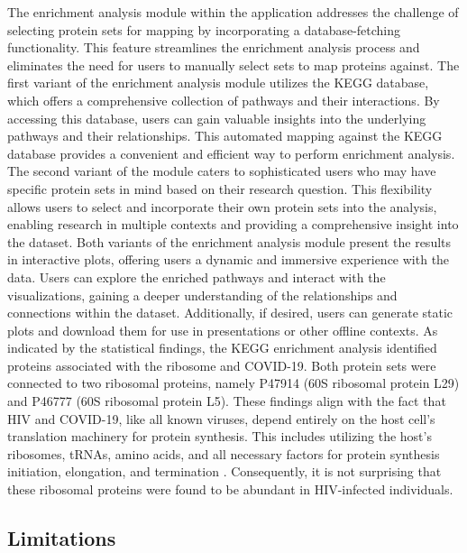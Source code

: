 \documentclass[
  11pt,
]{article}
\let\origfigure\figure
\begin{document}
The enrichment analysis module within the application addresses the
challenge of selecting protein sets for mapping by incorporating a
database-fetching functionality. This feature streamlines the enrichment
analysis process and eliminates the need for users to manually select
sets to map proteins against. The first variant of the enrichment
analysis module utilizes the KEGG database, which offers a comprehensive
collection of pathways and their interactions. By accessing this
database, users can gain valuable insights into the underlying pathways
and their relationships. This automated mapping against the KEGG
database provides a convenient and efficient way to perform enrichment
analysis. The second variant of the module caters to sophisticated users
who may have specific protein sets in mind based on their research
question. This flexibility allows users to select and incorporate their
own protein sets into the analysis, enabling research in multiple
contexts and providing a comprehensive insight into the dataset. Both
variants of the enrichment analysis module present the results in
interactive plots, offering users a dynamic and immersive experience
with the data. Users can explore the enriched pathways and interact with
the visualizations, gaining a deeper understanding of the relationships
and connections within the dataset. Additionally, if desired, users can
generate static plots and download them for use in presentations or
other offline contexts. As indicated by the statistical findings, the
KEGG enrichment analysis identified proteins associated with the
ribosome and COVID-19. Both protein sets were connected to two ribosomal
proteins, namely P47914 (60S ribosomal protein L29) and P46777 (60S
ribosomal protein L5). These findings align with the fact that HIV and
COVID-19, like all known viruses, depend entirely on the host cell's
translation machinery for protein synthesis. This includes utilizing the
host's ribosomes, tRNAs, amino acids, and all necessary factors for
protein synthesis initiation, elongation, and termination
\citep{Ohlmann2014}. Consequently, it is not surprising that these
ribosomal proteins were found to be abundant in HIV-infected
individuals.

\hypertarget{limitations}{%
\subsection{Limitations}\label{limitations}}

\bgroup  \origfigure[H] 
\end{document}
